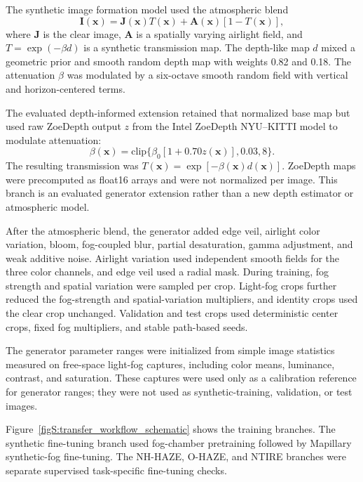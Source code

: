 \documentclass[9pt]{osa-supplemental-document}
\begin{document}
The synthetic image formation model used the atmospheric blend
\begin{equation}
\mathbf{I}(\mathbf{x}) =
\mathbf{J}(\mathbf{x})T(\mathbf{x}) +
\mathbf{A}(\mathbf{x})[1 - T(\mathbf{x})],
\label{eqS:synthetic_atmospheric_blend}
\end{equation}
where $\mathbf{J}$ is the clear image, $\mathbf{A}$ is a spatially varying airlight field, and $T=\exp(-\beta d)$ is a synthetic transmission map. The depth-like map $d$ mixed a geometric prior and smooth random depth map with weights 0.82 and 0.18. The attenuation $\beta$ was modulated by a six-octave smooth random field with vertical and horizon-centered terms.

The evaluated depth-informed extension retained that normalized base map
but used raw ZoeDepth output $z$ from the Intel ZoeDepth NYU--KITTI
model to modulate attenuation:
\[
\beta(\mathbf{x})=\mathrm{clip}\{\beta_0[1+0.70z(\mathbf{x})],0.03,8\}.
\]
The resulting transmission was
$T(\mathbf{x})=\exp[-\beta(\mathbf{x})d(\mathbf{x})]$. ZoeDepth maps
were precomputed as float16 arrays and were not normalized per image.
This branch is an evaluated generator extension rather than a new depth
estimator or atmospheric model.

After the atmospheric blend, the generator added edge veil, airlight color variation, bloom, fog-coupled blur, partial desaturation, gamma adjustment, and weak additive noise. Airlight variation used independent smooth fields for the three color channels, and edge veil used a radial mask. During training, fog strength and spatial variation were sampled per crop. Light-fog crops further reduced the fog-strength and spatial-variation multipliers, and identity crops used the clear crop unchanged. Validation and test crops used deterministic center crops, fixed fog multipliers, and stable path-based seeds.

The generator parameter ranges were initialized from simple image statistics measured on free-space light-fog captures, including color means, luminance, contrast, and saturation. These captures were used only as a calibration reference for generator ranges; they were not used as synthetic-training, validation, or test images.

Figure~\ref{figS:transfer_workflow_schematic} shows the training branches. The synthetic fine-tuning branch used fog-chamber pretraining followed by Mapillary synthetic-fog fine-tuning. The NH-HAZE, O-HAZE, and NTIRE branches were separate supervised task-specific fine-tuning checks.
\end{document}
